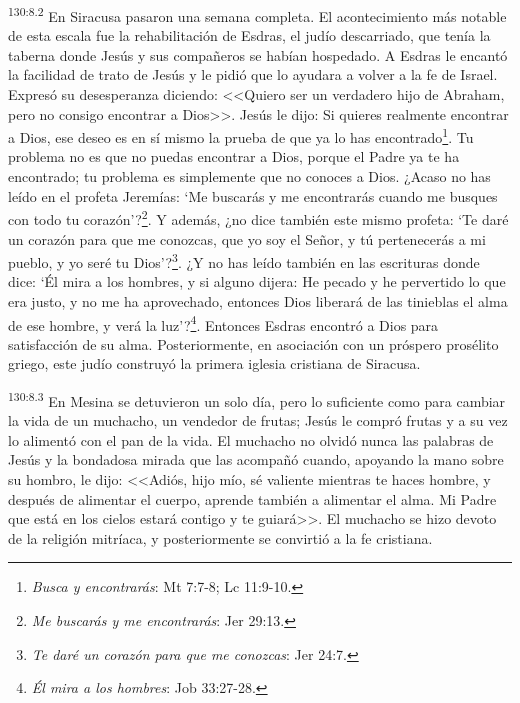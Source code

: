 \par 
\textsuperscript{130:8.2} En Siracusa pasaron una semana completa. El acontecimiento más notable de esta escala fue la rehabilitación de Esdras, el judío descarriado, que tenía la taberna donde Jesús y sus compañeros se habían hospedado. A Esdras le encantó la facilidad de trato de Jesús y le pidió que lo ayudara a volver a la fe de Israel. Expresó su desesperanza diciendo: <<Quiero ser un verdadero hijo de Abraham, pero no consigo encontrar a Dios>>. Jesús le dijo: \guillemotleft Si quieres realmente encontrar a Dios, ese deseo es en sí mismo la prueba de que ya lo has encontrado\footnote{\textit{Busca y encontrarás}: Mt 7:7-8; Lc 11:9-10.}. Tu problema no es que no puedas encontrar a Dios, porque el Padre ya te ha encontrado; tu problema es simplemente que no conoces a Dios. ¿Acaso no has leído en el profeta Jeremías: `Me buscarás y me encontrarás cuando me busques con todo tu corazón'?\footnote{\textit{Me buscarás y me encontrarás}: Jer 29:13.}. Y además, ¿no dice también este mismo profeta: `Te daré un corazón para que me conozcas, que yo soy el Señor, y tú pertenecerás a mi pueblo, y yo seré tu Dios'?\footnote{\textit{Te daré un corazón para que me conozcas}: Jer 24:7.}. ¿Y no has leído también en las escrituras donde dice: `Él mira a los hombres, y si alguno dijera: He pecado y he pervertido lo que era justo, y no me ha aprovechado, entonces Dios liberará de las tinieblas el alma de ese hombre, y verá la luz'?\footnote{\textit{Él mira a los hombres}: Job 33:27-28.}\guillemotright. Entonces Esdras encontró a Dios para satisfacción de su alma. Posteriormente, en asociación con un próspero prosélito griego, este judío construyó la primera iglesia cristiana de Siracusa.

\par 
\textsuperscript{130:8.3} En Mesina se detuvieron un solo día, pero lo suficiente como para cambiar la vida de un muchacho, un vendedor de frutas; Jesús le compró frutas y a su vez lo alimentó con el pan de la vida. El muchacho no olvidó nunca las palabras de Jesús y la bondadosa mirada que las acompañó cuando, apoyando la mano sobre su hombro, le dijo: <<Adiós, hijo mío, sé valiente mientras te haces hombre, y después de alimentar el cuerpo, aprende también a alimentar el alma. Mi Padre que está en los cielos estará contigo y te guiará>>. El muchacho se hizo devoto de la religión mitríaca, y posteriormente se convirtió a la fe cristiana.

